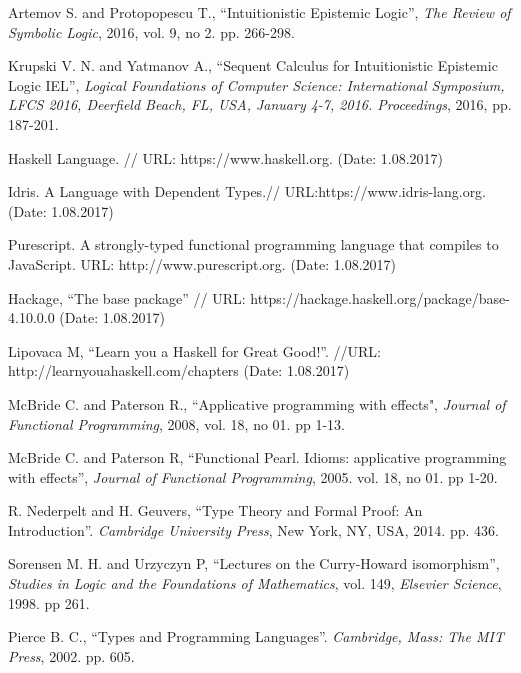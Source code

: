 \documentclass[a4paper]{article}
\begin{document}
  \begin{thebibliography}{}

   Artemov S. and Protopopescu T., \/ ``Intuitionistic Epistemic Logic'', \textit{The
  Review of Symbolic Logic}, 2016, vol. 9, no 2. pp. 266-298.\parskip=1mm

   Krupski V. N. and Yatmanov A., \/ ``Sequent Calculus for Intuitionistic Epistemic Logic
  IEL'', \textit{Logical Foundations of Computer Science: International Symposium, LFCS 2016, Deerfield
  Beach, FL, USA, January 4-7, 2016. Proceedings}, 2016, pp. 187-201.\parskip=1mm

   Haskell Language. // URL: https://www.haskell.org. (Date: 1.08.2017) \parskip=1mm

   Idris. A Language with Dependent Types.// URL:https://www.idris-lang.org. (Date:
  1.08.2017) \parskip=1mm

   Purescript. A strongly-typed functional programming language that compiles to JavaScript.
  URL: http://www.purescript.org. (Date: 1.08.2017) \parskip=1mm

   Hackage, \/ ``The base package'' // URL: https://hackage.haskell.org/package/base-4.10.0.0
  (Date: 1.08.2017) \parskip=1mm

   Lipovaca M, \/ ``Learn you a Haskell for Great Good!''. //URL:
  http://learnyouahaskell.com/chapters (Date: 1.08.2017) \parskip=1mm

   McBride C. and Paterson R., ``Applicative programming with effects", \textit{Journal of
  Functional Programming}, 2008, vol. 18, no 01. pp 1-13. \parskip=1mm

   McBride C. and Paterson R, ``Functional Pearl. Idioms: applicative programming with
  effects'', \textit{Journal of Functional Programming}, 2005. vol. 18, no 01. pp 1-20. \parskip=1mm

   R. Nederpelt and H. Geuvers, ``Type Theory and Formal Proof: An Introduction''.
  \textit{Cambridge University Press}, New York, NY, USA, 2014. pp. 436. \parskip=1mm

   Sorensen M. H. and Urzyczyn P, ``Lectures on the Curry-Howard isomorphism'',
  \textit{Studies in Logic and the Foundations of Mathematics}, vol. 149, \textit{Elsevier Science}, 1998.
  pp 261. \parskip=1mm

   Pierce B. C., ``Types and Programming Languages''. \textit{Cambridge, Mass: The MIT
  Press}, 2002. pp. 605. \parskip=1mm


\end{thebibliography}
\end{document}
